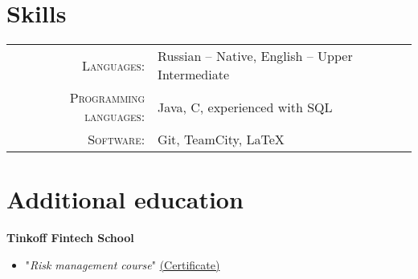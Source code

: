 \documentclass[a4paper,10pt]{article}
\begin{document}
\section{Skills}
\begin{tabular}{rl}
    \textsc{Languages}: & Russian -- Native, English -- Upper Intermediate\\
    \textsc{Programming languages}: & Java, C, experienced with SQL \\
    \textsc{Software}: & Git, TeamCity, \LaTeX \\
\end{tabular}

\section{Additional education}
    
    \textbf{Tinkoff Fintech School}     
    \begin{itemize}
        \item "\textit{Risk management course}" 
        \href{https://olegvelikanov.github.io/src/Tinkoff_fintech_school_certificate.jpeg}{ \footnotesize (Certificate)}
    \end{itemize} 
\end{document}
